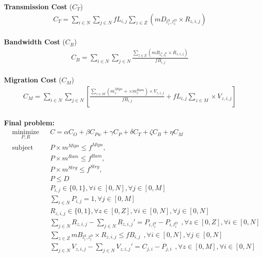 \documentclass{article}
\begin{document}
\noindent\textbf{Transmission Cost} ($C_T$)\\[6pt]
\begin{equation*}
\begin{split}
& C_T = \sum_{i\in N}\sum_{j\in N} fL_{i,j}\sum_{z\in Z}\left( mD_{l^S_z,l^D_z} \times R_{z, i,j} \right)
\end{split}
\end{equation*}\\[6pt]

\noindent\textbf{Bandwidth Cost} ($C_B$)\\[6pt]
\begin{equation*}
\begin{split}
& C_B = \sum_{i\in N}\sum_{j\in N} \frac{\sum_{z\in Z}\left( mB_{l^S_z,l^D_z} \times R_{z, i,j} \right)}{fB_{i,j}}
\end{split}
\end{equation*}\\[6pt]

\noindent\textbf{Migration Cost} ($C_M$)\\[6pt]
\begin{equation*}
\begin{split}
& C_M = \sum_{i\in N}\sum_{j\in N} \left[ \frac{\sum_{z\in M}\left(m^{Mips}_{z} + \times m^{Ram}_{z}\right) \times V_{z, i,j}}{fB_{i,j}} + fL_{i,j} \sum_{z\in M} \times V_{z, i,j} \right]
\end{split}
\end{equation*}\\[6pt]

\pagebreak
\noindent\textbf{Final problem:}\\[6pt]
\begin{equation*}
\begin{aligned}
& \underset{P, R}{\text{minimize}}
& & C = \alpha C_O + \beta C_{Pw} + \gamma C_P  + \delta C_T + \zeta C_B + \eta C_M\\
& \text{subject to}
& & P\times m^{Mips} \leq f^{Mips}, \\
&&& P\times m^{Ram} \leq f^{Ram}, \\
&&& P\times m^{Strg} \leq f^{Strg}, \\
&&& P\leq D\\
&&& P_{i,j} \in \{0, 1\}, \forall i \in [0, N], \forall j \in [0, M]\\
&&& \sum_{i \in N} P_{i,j} = 1, \forall j \in [0, M]\\
&&& R_{z, i,j} \in \{0, 1\}, \forall z \in [0, Z], \forall i \in [0, N], \forall j \in [0, N]\\
&&& \sum_{j\in N} R_{z, i, j} - \sum_{j\in N} R_{z, i, j}' = P_{i, l^S_z} - P_{i, l^D_z}~~, \forall z \in [0, Z], \forall i \in [0, N]\\
&&& \sum_{z\in Z} mB_{l^S_z,l^D_z} \times R_{z, i,j} \le fB_{i,j}~~, \forall i \in [0, N], \forall j \in [0, N]\\
&&& \sum_{j\in N} V_{z, i, j} - \sum_{j\in N} V_{z, i, j}' = C_{j, i} - P_{j, i}~~, \forall z \in [0, M], \forall i \in [0, N]
\end{aligned}
\end{equation*}
\end{document}
